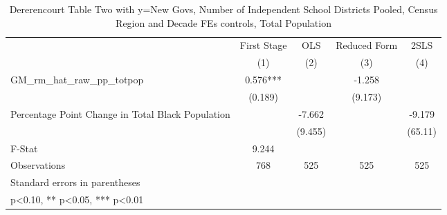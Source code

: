 \begin{table}[htbp]\centering
\def\sym#1{\ifmmode^{#1}\else\(^{#1}\)\fi}
\caption{Dererencourt Table Two with y=New Govs, Number of Independent School Districts  Pooled, Census Region and Decade FEs controls, Total Population}
\begin{tabular}{l*{4}{c}}
\toprule
                    & First Stage   &         OLS   &Reduced Form   &        2SLS   \\
                    &\multicolumn{1}{c}{(1)}   &\multicolumn{1}{c}{(2)}   &\multicolumn{1}{c}{(3)}   &\multicolumn{1}{c}{(4)}   \\
\midrule
GM\_rm\_hat\_raw\_pp\_totpop&       0.576***&               &      -1.258   &               \\
                    &     (0.189)   &               &     (9.173)   &               \\
\addlinespace
Percentage Point Change in Total Black Population&               &      -7.662   &               &      -9.179   \\
                    &               &     (9.455)   &               &     (65.11)   \\
\midrule
F-Stat              &       9.244   &               &               &               \\
Observations        &         768   &         525   &         525   &         525   \\
\bottomrule
\multicolumn{5}{l}{\footnotesize Standard errors in parentheses}\\
\multicolumn{5}{l}{\footnotesize * p<0.10, ** p<0.05, *** p<0.01}\\
\end{tabular}
\end{table}
